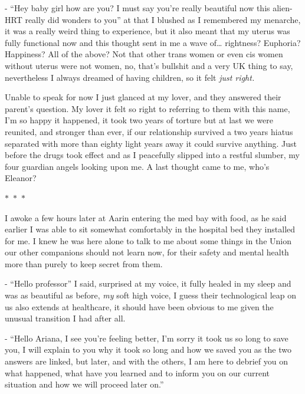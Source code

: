 \documentclass[colorlinks,12pt,a4paper]{book}
\newcommand\sep{\begin{center}
  \boldmath $\ast$~$\ast$~$\ast$
\end{center}}
\begin{document}
 - “Hey baby girl how are you? I must say you're really beautiful now this alien-HRT really did wonders to you” at that
  I blushed as I remembered my menarche, it was a really weird thing to experience, but it also meant that my uterus was 
  fully functional now and this thought sent in me a wave of… rightness? Euphoria? Happiness? All of the above? Not that
   other trans women or even cis women without uterus were not women, no, that's bullshit and a very UK thing to say, 
   nevertheless I always dreamed of having children, so it felt \textit{just right.}\par
   \bigskip
 
 Unable to speak for now I just glanced at my lover, and they answered their parent's question. My lover it felt so 
 right to referring to them with this name, I'm so happy it happened, it took two years of torture but at last we were
  reunited, and stronger than ever, if our relationship survived a two years hiatus separated with more than eighty light
   years away it could survive anything. Just before the drugs took effect and as I peacefully slipped into a restful 
   slumber, my four guardian angels looking upon me. A last thought came to me, who's Eleanor? 
 
 \sep
 
 I awoke a few hours later at Aarin entering the med bay with food, as he said earlier I was able to sit somewhat 
 comfortably in the hospital bed they installed for me. I knew he was here alone to talk to me about some things 
 in the Union our other companions should not learn now, for their safety and mental health more than purely to keep
  secret from them.\par
  \bigskip
 
 - “Hello professor” I said, surprised at my voice, it fully healed in my sleep and was as beautiful as before, \textit{my} soft 
 high voice, I guess their technological leap on us also extends at healthcare, it should have been obvious to me given 
 the unusual transition I had after all.\par
 \bigskip
 
 - “Hello Ariana, I see you're feeling better, I'm sorry it took us so long to save you, I will explain to you why it took 
 so long and how we saved you as the two answers are linked, but later, and with the others, I am here to debrief you 
 on what happened, what have you learned and to inform you on our current situation and how we will proceed later on.”\par
 \bigskip
 
\end{document}
